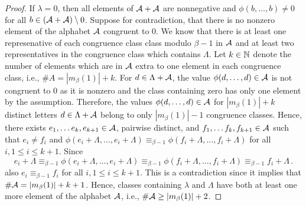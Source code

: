 \begin{proof}

If $\lambda=0$, then all elements of $\mathcal{A}+\mathcal{A}$ are nonnegative and $\phi(b,\dots,b)\neq 0$ for all $b\in(\mathcal{A}+\mathcal{A})\setminus 0$. Suppose for contradiction, that there is no nonzero element of the alphabet $\mathcal{A}$ congruent to 0. We know that there is at least one represenative of each congruence class class modulo $\beta-1$ in $\mathcal{A}$ and at least two representatives in the congruence class which contains $\Lambda$. Let $k\in\mathbb{N}$ denote the number of elements which are in $\mathcal{A}$ extra to one element in each congruence class, i.e., $\#A=|m_\beta(1)|+k$.  For $d\in\Lambda+\mathcal{A}$, the value $\phi(d,\dots,d)\in\mathcal{A}$ is not congruent to 0 as it is nonzero and the class containing zero has only one element by the assumption. Therefore, the values  $\phi(d,\dots,d)\in\mathcal{A}$ for $|m_\beta(1)|+k$ distinct letters $d\in\Lambda+\mathcal{A}$ belong to only $|m_\beta(1)|-1$ congruence classes. Hence, there exists $e_1,\dots e_k, e_{k+1}\in\mathcal{A}$, pairwise distinct, and $f_1,\dots f_k, f_{k+1}\in\mathcal{A}$ such that $e_i\neq f_i$ and $\phi(e_i+\Lambda,\dots, e_i+\Lambda)\equiv_{\beta-1}\phi(f_i+\Lambda,\dots, f_i+\Lambda)$ for all $i, 1\leq i\leq k+1$. Since 
$$
e_i+\Lambda\equiv_{\beta-1}\phi(e_i+\Lambda,\dots, e_i+\Lambda)\equiv_{\beta-1}\phi(f_i+\Lambda,\dots, f_i+\Lambda)\equiv_{\beta-1}f_i+\Lambda\,.
$$ 
also $e_i\equiv_{\beta-1}f_i$ for all $i, 1\leq i\leq k+1$. This is a contradiction since it implies that $\#\mathcal{A}=|m_\beta(1)|+k+1$. Hence, classes containing $\lambda$ and $\Lambda$ have both at least one more  element of the alphabet $\mathcal{A}$, i.e., $\#\mathcal{A}\geq |m_\beta(1)|+2$. 
\end{proof}

